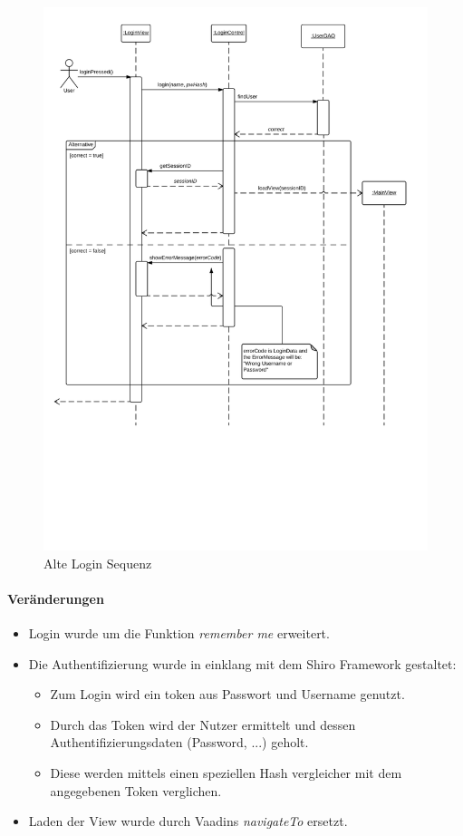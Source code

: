 \begin{figure}[H]
      \centering
        \includegraphics[scale=0.1]{Login-Sequenz.pdf}
       \caption{Alte Login Sequenz}
    \end{figure}

    \paragraph{Veränderungen}
        \begin{itemize}
            \item Login wurde um die Funktion \emph{remember me} erweitert.
            \item Die Authentifizierung wurde in einklang mit dem Shiro Framework gestaltet:
            \begin{itemize}
                \item Zum Login wird ein token aus Passwort und Username genutzt.
                \item Durch das Token wird der Nutzer ermittelt und dessen Authentifizierungsdaten (Password, ...) geholt.
                \item Diese werden mittels einen speziellen Hash vergleicher mit dem angegebenen Token verglichen.
            \end{itemize}
            \item Laden der View wurde durch Vaadins \emph{navigateTo} ersetzt.
        \end{itemize}

